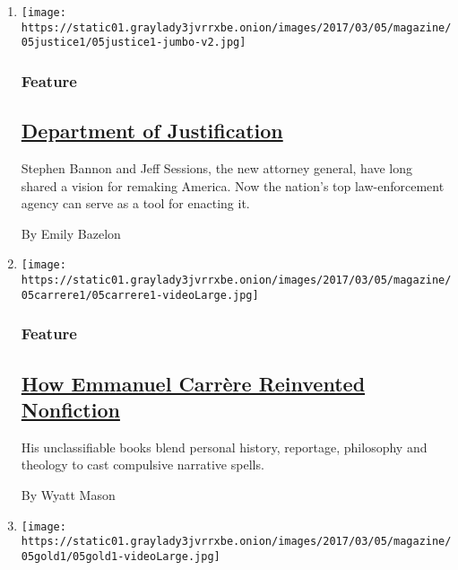 \begin{enumerate}
\def\labelenumi{\arabic{enumi}.}
\item
  \texttt{[image: https://static01.graylady3jvrrxbe.onion/images/2017/03/05/magazine/05justice1/05justice1-jumbo-v2.jpg]}

  \hypertarget{feature}{%
  \subsubsection{Feature}\label{feature}}

  \hypertarget{department-of-justification}{%
  \subsection{\texorpdfstring{\href{/2017/02/28/magazine/jeff-sessions-stephen-bannon-justice-department.html}{Department
  of
  Justification}}{Department of Justification}}\label{department-of-justification}}

  Stephen Bannon and Jeff Sessions, the new attorney general, have long
  shared a vision for remaking America. Now the nation's top
  law-enforcement agency can serve as a tool for enacting it.

  By Emily Bazelon
\item
  \texttt{[image: https://static01.graylady3jvrrxbe.onion/images/2017/03/05/magazine/05carrere1/05carrere1-videoLarge.jpg]}

  \hypertarget{feature-1}{%
  \subsubsection{Feature}\label{feature-1}}

  \hypertarget{how-emmanuel-carruxe8re-reinvented-nonfiction}{%
  \subsection{\texorpdfstring{\href{/2017/03/02/magazine/how-emmanuel-carrere-reinvented-nonfiction.html}{How
  Emmanuel Carrère Reinvented
  Nonfiction}}{How Emmanuel Carrère Reinvented Nonfiction}}\label{how-emmanuel-carruxe8re-reinvented-nonfiction}}

  His unclassifiable books blend personal history, reportage, philosophy
  and theology to cast compulsive narrative spells.

  By Wyatt Mason
\item
  \texttt{[image: https://static01.graylady3jvrrxbe.onion/images/2017/03/05/magazine/05gold1/05gold1-videoLarge.jpg]}


\end{enumerate}
